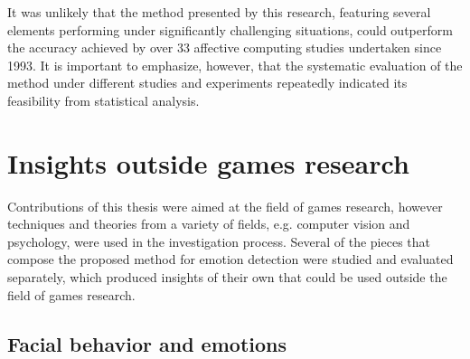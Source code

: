 It was unlikely that the method presented by this research, featuring several elements performing under significantly challenging situations, could outperform the accuracy achieved by over 33 affective computing studies undertaken since 1993. It is important to emphasize, however, that the systematic evaluation of the method under different studies and experiments repeatedly indicated its feasibility from statistical analysis.





\section{Insights outside games research}

Contributions of this thesis were aimed at the field of games research, however techniques and theories from a variety of fields, e.g. computer vision and psychology, were used in the investigation process. Several of the pieces that compose the proposed method for emotion detection were studied and evaluated separately, which produced insights of their own that could be used outside the field of games research.

\subsection{Facial behavior and emotions}

